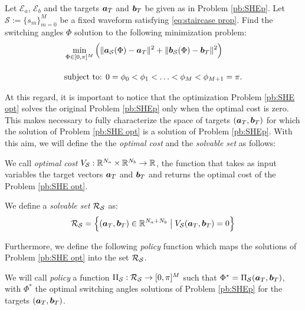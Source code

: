 \documentclass[twocolumn]{autart}    %
\begin{document}
\begin{problem}\label{pb:SHE opt}
Let $\mathcal{E}_a$, $\mathcal{E}_b$ and the targets $\bm{a}_T$ and $\bm{b}_T$ be given as in Problem \ref{pb:SHEp}.  Let $\mathcal S := \{ s_m\}_{m=0}^M$ be a fixed waveform satisfying \eqref{eq:staircase prop}.  Find the switching angles $\Phi$ solution to the following minimization problem:
\begin{align}
	&\min_{\Phi \in [0,\pi]^{M}} \Big( \|\bm{a}_{\mathcal{S}} (\Phi) - \bm{a}_T\|^2 + \| \bm{b}_{\mathcal{S}} (\Phi) - \bm{b}_T\|^2\Big)\notag 
	\\[10pt]
	&\mbox{subject to: } 0 = \phi_0 <\phi_1 < \ldots < \phi_{M} < \phi_{M+1} = \pi. \notag 
\end{align}
\end{problem}
At this regard, it is important to notice that the optimization Problem \ref{pb:SHE opt} solves the original Problem \ref{pb:SHEp} only when the optimal cost is zero. This makes necessary to fully characterize the space of targets $(\bm{a}_T,\bm{b}_T)$ for which the solution of Problem \ref{pb:SHE opt} is a solution of Problem \ref{pb:SHEp}. With this aim, we will define the the \textit{optimal cost} and the \textit{solvable set} as follows:
\vspace{1em}
\begin{definition}
We call \emph{optimal cost} $V_{\mathcal{S}}:\mathbb{R}^{N_a}\times \mathbb{R}^{N_b} \rightarrow \mathbb{R}$, the function that takes as input variables the target vectors $\bm{a}_T$ and $\bm{b}_T$ and returns the optimal cost of the Problem \ref{pb:SHE opt}.
\end{definition}

\vspace{1em}
\begin{definition}
We define a \emph{solvable set} $\mathcal{R}_{\mathcal{S}}$ as:
\begin{gather}
	\mathcal{R}_{\mathcal{S}} = \Big\{ (\bm{a}_T,\bm{b}_T) \in \mathbb{R}^{N_a+N_b}\;\big|\; V_{\mathcal{S}}(\bm{a}_T,\bm{b}_T) = 0\Big\}
\end{gather}
\end{definition}

Furthermore, we define the following \textit{policy} function which maps the solutions of Problem \ref{pb:SHE opt} into the set $\mathcal{R}_{\mathcal{S}}$.

\vspace{1em}
\begin{definition}[Policy]\label{def:policy}
We will call \emph{policy} a function $\Pi_{\mathcal{S}}: \mathcal{R}_{\mathcal{S}} \rightarrow [0,\pi]^M$ such that $\Phi^* = \Pi_{\mathcal{S}}(\bm{a}_T,\bm{b}_T)$, with $\Phi^*$ the optimal switching angles solutions of Problem \ref{pb:SHEp} for the targets $(\bm{a}_T,\bm{b}_T)$.
\end{definition} 
\end{document}
